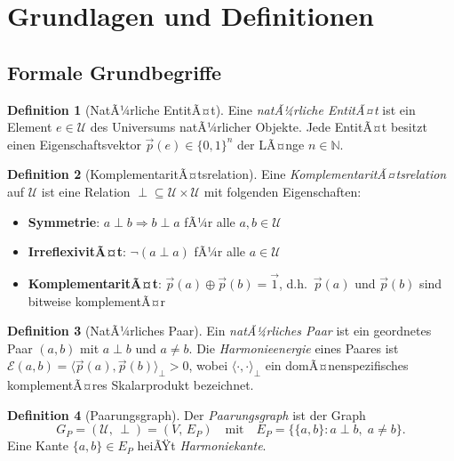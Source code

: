 ﻿\documentclass[a4paper,12pt]{article}
\theoremstyle{definition}
\newtheorem{definition}{Definition}
\begin{document}
\section{Grundlagen und Definitionen}
\label{sec:grundlagen}

\subsection{Formale Grundbegriffe}

\begin{definition}[NatÃ¼rliche EntitÃ¤t]
	Eine \emph{natÃ¼rliche EntitÃ¤t} ist ein Element $e \in \mathcal{U}$ des Universums
	natÃ¼rlicher Objekte. Jede EntitÃ¤t besitzt einen Eigenschaftsvektor
	$\vec{p}(e) \in \{0,1\}^n$ der LÃ¤nge $n \in \mathbb{N}$.
\end{definition}

\begin{definition}[KomplementaritÃ¤tsrelation]
	Eine \emph{KomplementaritÃ¤tsrelation} auf $\mathcal{U}$ ist eine Relation
	${\perp} \subseteq \mathcal{U} \times \mathcal{U}$ mit folgenden Eigenschaften:
	\begin{itemize}
		\item \textbf{Symmetrie}: $a \perp b \Rightarrow b \perp a$ fÃ¼r alle $a, b \in \mathcal{U}$
		\item \textbf{IrreflexivitÃ¤t}: $\neg(a \perp a)$ fÃ¼r alle $a \in \mathcal{U}$
		\item \textbf{KomplementaritÃ¤t}: $\vec{p}(a) \oplus \vec{p}(b) = \vec{1}$,
		d.h.\ $\vec{p}(a)$ und $\vec{p}(b)$ sind bitweise komplementÃ¤r
	\end{itemize}
\end{definition}

\begin{definition}[NatÃ¼rliches Paar]
	Ein \emph{natÃ¼rliches Paar} ist ein geordnetes Paar $(a, b)$ mit $a \perp b$ und $a \neq b$.
	Die \emph{Harmonieenergie} eines Paares ist
	$\mathcal{E}(a, b) = \langle \vec{p}(a), \vec{p}(b) \rangle_\perp > 0$,
	wobei $\langle \cdot, \cdot \rangle_\perp$ ein domÃ¤nenspezifisches komplementÃ¤res
	Skalarprodukt bezeichnet.
\end{definition}

\begin{definition}[Paarungsgraph]
	Der \emph{Paarungsgraph} ist der Graph
	\[
		G_P = (\mathcal{U},\, {\perp}) = (V,\, E_P)
		\quad\text{mit}\quad
		E_P = \{\{a, b\} : a \perp b,\; a \neq b\}.
	\]
	Eine Kante $\{a,b\} \in E_P$ heiÃŸt \emph{Harmoniekante}.
\end{definition}
\end{document}
